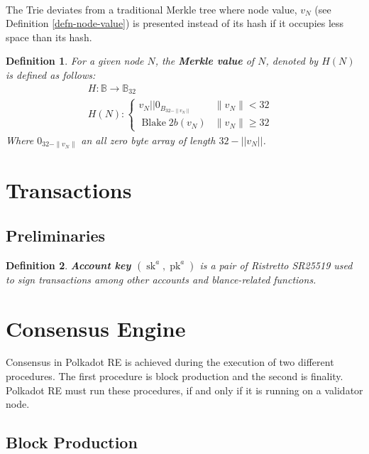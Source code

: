 \documentclass{article}
\newcommand{\tmop}[1]{\ensuremath{\operatorname{#1}}}
\newcommand{\tmstrong}[1]{\textbf{#1}}
\newcommand{\tmtextbf}[1]{{\bfseries{#1}}}
\newtheorem{definition}{Definition}
\providecommand{\tmop}[1]{\ensuremath{\mathrm{#1}}}
\providecommand{\tmstrong}[1]{\tmtextbf{#1}}
\providecommand{\tmtextbf}[1]{\tmtextbf{#1}}
\newtheorem{definition}{Definition}
\begin{document}
\

The Trie deviates from a traditional Merkle tree where node value, $v_N$ (see
Definition \ref{defn-node-value}) is presented instead of its hash if it
occupies less space than its hash.

\begin{definition}
  \label{defn-merkle-value}For a given node $N$, the {\tmstrong{Merkle value}}
  of $N$, denoted by $H (N)$ is defined as follows:
  \[ \begin{array}{lll}
       & H : \mathbb{B} \rightarrow \mathbb{B}_{32} & \\
       & H (N) : \left\{ \begin{array}{lll}
         v_N | | 0_{B_{32 - \| v_N \|}} & \|v_N \|< 32 & \\
         \tmop{Blake} 2 b (v_N) & \|v_N \| \geqslant 32 & 
       \end{array} \right. & 
     \end{array} \]
  Where $0_{32 - \| v_N \|}$ an all zero byte array of length $32 - | | v_N |
  |$.
\end{definition}

\section{Transactions}

\subsection{Preliminaries}

\begin{definition}
  \label{defn-account-key}{\tmstrong{Account key $(\tmop{sk}^a,
  \tmop{pk}^a)$}} is a pair of Ristretto SR25519 used to sign transactions
  among other accounts and blance-related functions.
\end{definition}

\section{Consensus Engine}

Consensus in Polkadot RE is achieved during the execution of two different
procedures. The first procedure is block production and the second is
finality. Polkadot RE must run these procedures, if and only if it is running
on a validator node.

\subsection{Block Production}
\end{document}

